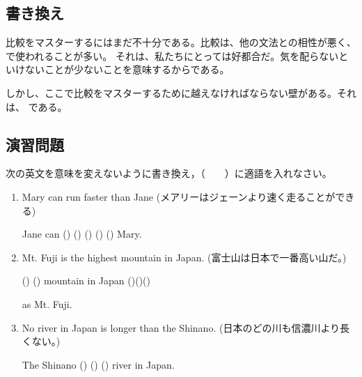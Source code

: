 \subsection{書き換え}
    比較をマスターするにはまだ不十分である。比較は、他の文法との相性が悪く、 で使われることが多い。
    それは、私たちにとっては好都合だ。気を配らないといけないことが少ないことを意味するからである。

    しかし、ここで比較をマスターするために越えなければならない壁がある。それは、 である。

\subsection{演習問題}
    次の英文を意味を変えないように書き換え，（　　）に適語を入れなさい。
    \begin{enumerate}[leftmargin=*, itemsep=2.2em]
        \item Mary can run faster than Jane \qquad (メアリーはジェーンより速く走ることができる)
        \par\vspace{0.85em}
        \noindent\hspace{2em}Jane can () () ()
        () () Mary.
        \par\vspace{0.55em}
        \item Mt. Fuji is the highest mountain in Japan. \qquad (富士山は日本で一番高い山だ。)
        \par\vspace{0.85em}
        \noindent\hspace{2em}() () mountain in Japan ()()()

        as Mt. Fuji.
        \par\vspace{0.55em}
        \item No river in Japan is longer than the Shinano. \qquad (日本のどの川も信濃川より長くない。)
        \par\vspace{0.85em}
        \noindent\hspace{2em}The Shinano () () () river in Japan.
        \par\vspace{0.55em}
    \end{enumerate}

